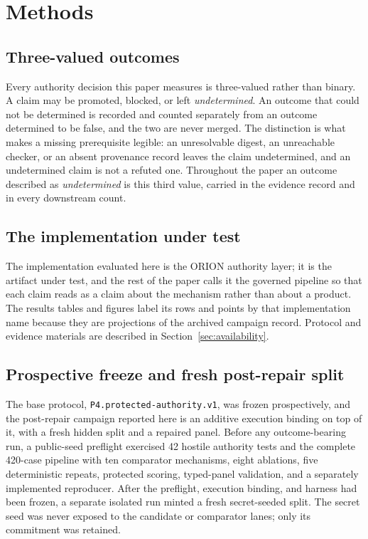 \section{Methods}
\label{sec:methods}

\subsection{Three-valued outcomes}
Every authority decision this paper measures is three-valued rather than binary. A claim may be promoted, blocked, or left \emph{undetermined}. An outcome that could not be determined is recorded and counted separately from an outcome determined to be false, and the two are never merged. The distinction is what makes a missing prerequisite legible: an unresolvable digest, an unreachable checker, or an absent provenance record leaves the claim undetermined, and an undetermined claim is not a refuted one. Throughout the paper an outcome described as \emph{undetermined} is this third value, carried in the evidence record and in every downstream count.

\subsection{The implementation under test}
The implementation evaluated here is the ORION authority layer; it is the artifact under test, and the rest of the paper calls it the governed pipeline so that each claim reads as a claim about the mechanism rather than about a product. The results tables and figures label its rows and points by that implementation name because they are projections of the archived campaign record. Protocol and evidence materials are described in Section~\ref{sec:availability}.

\subsection{Prospective freeze and fresh post-repair split}
The base protocol, \texttt{P4.protected-authority.v1}, was frozen prospectively, and the post-repair campaign reported here is an additive execution binding on top of it, with a fresh hidden split and a repaired panel. Before any outcome-bearing run, a public-seed preflight exercised 42 hostile authority tests and the complete 420-case pipeline with ten comparator mechanisms, eight ablations, five deterministic repeats, protected scoring, typed-panel validation, and a separately implemented reproducer. After the preflight, execution binding, and harness had been frozen, a separate isolated run minted a fresh secret-seeded split. The secret seed was never exposed to the candidate or comparator lanes; only its commitment was retained.


